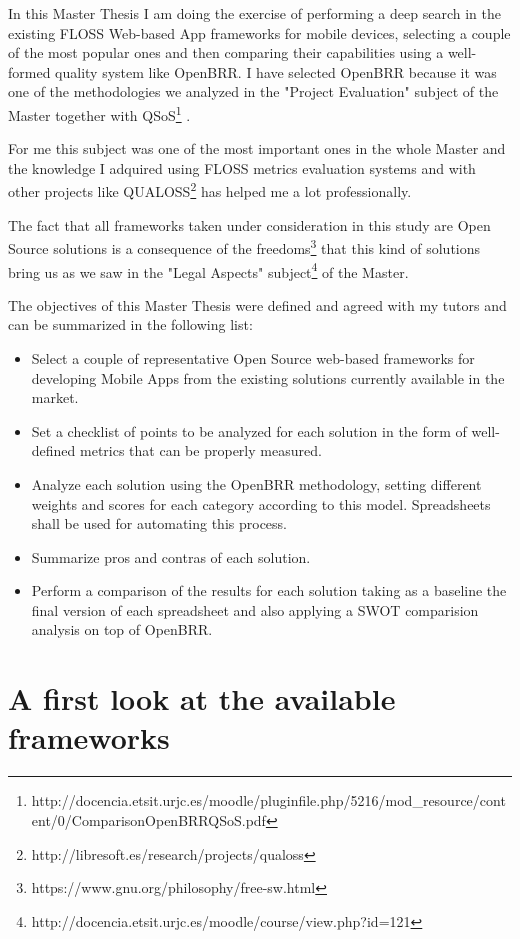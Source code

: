 \documentclass[a4paper,12pt]{book}
\begin{document}
In this Master Thesis I am doing the exercise of performing a deep search in the existing FLOSS Web-based App frameworks for mobile devices, selecting a couple of the most popular ones and then comparing their capabilities using a well-formed quality system like OpenBRR. I have selected OpenBRR because it was one of the 
methodologies we analyzed in the "Project Evaluation" subject of the Master together with  QSoS\footnote{http://docencia.etsit.urjc.es/moodle/pluginfile.php/5216/mod\_resource/content/0/ComparisonOpenBRRQSoS.pdf} . 

For me this subject was one of the most important ones in the whole Master and the knowledge I adquired using FLOSS metrics evaluation systems and with other projects like QUALOSS\footnote{http://libresoft.es/research/projects/qualoss} has helped me a lot professionally.

The fact that all frameworks taken under consideration in this study are Open Source solutions is a consequence of the freedoms\footnote{https://www.gnu.org/philosophy/free-sw.html} that this kind of solutions bring us as we saw in the "Legal Aspects" subject\footnote{http://docencia.etsit.urjc.es/moodle/course/view.php?id=121}  of the Master.

The objectives of this Master Thesis were defined and agreed with my tutors and can be summarized in the following list:

\begin{itemize}
\item Select a couple of representative Open Source web-based frameworks for developing Mobile Apps from the existing solutions currently available in the market.
\item Set a checklist of points to be analyzed for each solution in the form of well-defined metrics that can be properly measured.
\item Analyze each solution using the OpenBRR methodology, setting different weights and scores for each category according to this model. Spreadsheets shall be used for automating this process.
\item Summarize pros and contras of each solution.
\item Perform a comparison of the results for each solution taking as a baseline the final version of each spreadsheet and also applying a SWOT comparision analysis on top of OpenBRR.
\end{itemize}


\chapter{A first look at the available frameworks}
\label{chap:overview}
\end{document}
